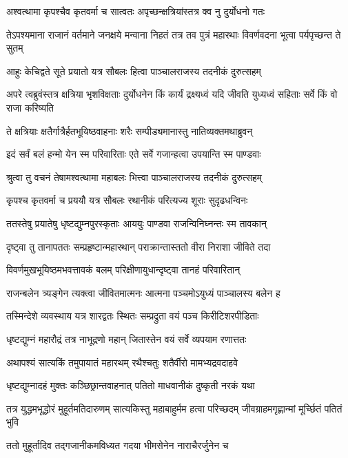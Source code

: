 \twolineshloka
{अश्वत्थामा कृपश्चैव कृतवर्मा च सात्वतः}
{अपृच्छन्क्षत्रियांस्तत्र क्व नु दुर्योधनो गतः}


\threelineshloka
{तेऽपश्यमाना राजानं वर्तमाने जनक्षये}
{मन्वाना निहतं तत्र तव पुत्रं महारथाः}
{विवर्णवदना भूत्वा पर्यपृच्छन्त ते सुतम्}


\twolineshloka
{आहुः केचिद्वते सूते प्रयातो यत्र सौबलः}
{हित्वा पाञ्चालराजस्य तदनीकं दुरुत्सहम्}


\threelineshloka
{अपरे त्वब्रुवंस्तत्र क्षत्रिया भृशविक्षताः}
{दुर्योधनेन किं कार्यं द्रक्ष्यध्वं यदि जीवति}
{युध्यध्वं सहिताः सर्वे किं वो राजा करिष्यति}


\twolineshloka
{ते क्षत्रियाः क्षतैर्गात्रैर्हतभूयिष्ठवाहनाः}
{शरैः सम्पीड्यमानास्तु नातिव्यक्तमथाब्रुवन्}


\twolineshloka
{इदं सर्वं बलं हन्मो येन स्म परिवारिताः}
{एते सर्वे गजान्हत्वा उपयान्ति स्म पाण्डवाः}


\twolineshloka
{श्रुत्वा तु वचनं तेषामश्वत्थामा महाबलः}
{भित्त्वा पाञ्चालराजस्य तदनीकं दुरुत्सहम्}


\twolineshloka
{कृपश्च कृतवर्मा च प्रययौ यत्र सौबलः}
{रथानीकं परित्यज्य शूराः सुदृढधन्विनः}


\twolineshloka
{ततस्तेषु प्रयातेषु धृष्टद्युम्नपुरस्कृताः}
{आययुः पाण्डवा राजन्विनिघ्नन्तः स्म तावकान्}


\twolineshloka
{दृष्ट्वा तु तानापततः सम्प्रहृष्टान्महारथान्}
{पराक्रान्तास्ततो वीरा निराशा जीविते तदा}


\twolineshloka
{विवर्णमुखभूयिष्ठमभवत्तावकं बलम्}
{परिक्षीणायुधान्दृष्ट्वा तानहं परिवारितान्}


\twolineshloka
{राजन्बलेन त्र्यङ्गेन त्यक्त्वा जीवितमात्मनः}
{आत्मना पञ्चमोऽयुध्यं पाञ्चालस्य बलेन ह}


\twolineshloka
{तस्मिन्देशे व्यवस्थाय यत्र शारद्वतः स्थितः}
{सम्प्रद्रुता वयं पञ्च किरीटिशरपीडिताः}


\twolineshloka
{धृष्टद्युम्नं महारौद्रं तत्र नाभूद्रणो महान्}
{जितास्तेन वयं सर्वे व्यपयाम रणात्ततः}


\twolineshloka
{अथापश्यं सात्यकिं तमुपायातं महारथम्}
{रथैश्चतुः शतैर्वीरो मामभ्यद्रवदाहवे}


\twolineshloka
{धृष्टद्युम्नादहं मुक्तः कञ्छिछ्रान्तवाहनात्}
{पतितो माधवानीकं दुष्कृती नरकं यथा}


तत्र युद्धमभूद्धोरं मुहूर्तमतिदारुणम्
\twolineshloka
{सात्यकिस्तु महाबाहुर्मम हत्वा परिच्छदम्}
{जीवग्राहमगृह्णान्मां मूर्च्छितं पतितं भुवि}


\twolineshloka
{ततो मुहूर्तादिव तद्गजानीकमविध्यत}
{गदया भीमसेनेन नाराचैरर्जुनेन च}


